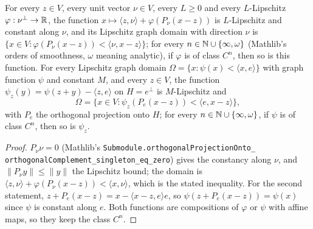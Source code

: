 \begin{lemma}
\label{lem:local-graph-domain}
\leanok
{}
For every $z \in V$, every unit vector $\nu \in V$, every $L \geq 0$ and every $L$-Lipschitz
$\varphi : \nu^\perp \to \mathbb{R}$, the function
$x \mapsto \langle z, \nu \rangle + \varphi(P_\nu(x - z))$ is $L$-Lipschitz and constant along
$\nu$, and its Lipschitz graph domain with direction $\nu$ is
$\{x \in V : \varphi(P_\nu(x - z)) < \langle \nu, x - z \rangle\}$; for every
$n \in \mathbb{N} \cup \{\infty, \omega\}$ (Mathlib's orders of smoothness, $\omega$ meaning analytic), if
$\varphi$ is of class $C^n$, then so is this function. For every Lipschitz graph domain
$\Omega = \{x : \psi(x) < \langle x, e \rangle\}$ with graph function $\psi$ and constant $M$, and
every $z \in V$, the function $\psi_z(y) = \psi(z + y) - \langle z, e \rangle$ on $H = e^\perp$ is
$M$-Lipschitz and
\[
  \Omega = \{x \in V : \psi_z(P_e(x - z)) < \langle e, x - z \rangle\} ,
\]
with $P_e$ the orthogonal projection onto $H$; for every $n \in \mathbb{N} \cup \{\infty, \omega\}$, if
$\psi$ is of class $C^n$, then so is $\psi_z$.
\end{lemma}

\begin{proof}
\leanok
$P_\nu \nu = 0$ (Mathlib's \texttt{Submodule.\allowbreak orthogonalProjectionOnto\_\allowbreak
orthogonalComplement\_\allowbreak singleton\_\allowbreak eq\_\allowbreak zero}) gives the
constancy along $\nu$, and $\|P_\nu y\| \leq \|y\|$ the Lipschitz bound; the domain is
$\langle z, \nu \rangle + \varphi(P_\nu(x - z)) < \langle x, \nu \rangle$, which is the stated
inequality. For the second statement,
$z + P_e(x - z) = x - \langle x - z, e \rangle e$, so $\psi(z + P_e(x - z)) = \psi(x)$ since
$\psi$ is constant along $e$. Both functions are compositions of $\varphi$ or $\psi$ with affine
maps, so they keep the class $C^n$.
\end{proof}

